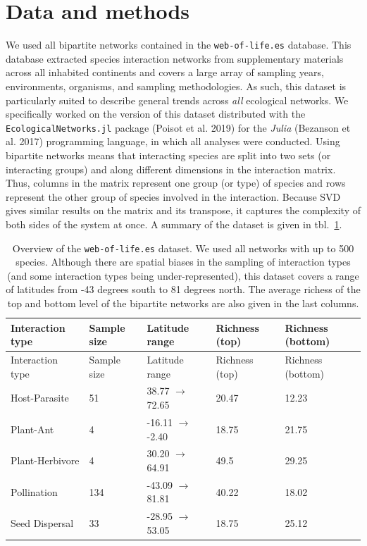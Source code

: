 \documentclass[10pt,oneside]{article}
\begin{document}
\hypertarget{data-and-methods}{%
\section{Data and methods}\label{data-and-methods}}

We used all bipartite networks contained in the \texttt{web-of-life.es}
database. This database extracted species interaction networks from
supplementary materials across all inhabited continents and covers a
large array of sampling years, environments, organisms, and sampling
methodologies. As such, this dataset is particularly suited to describe
general trends across \emph{all} ecological networks. We specifically
worked on the version of this dataset distributed with the
\texttt{EcologicalNetworks.jl} package (Poisot et al. 2019) for the
\emph{Julia} (Bezanson et al. 2017) programming language, in which all
analyses were conducted. Using bipartite networks means that interacting
species are split into two sets (or interacting groups) and along
different dimensions in the interaction matrix. Thus, columns in the
matrix represent one group (or type) of species and rows represent the
other group of species involved in the interaction. Because SVD gives
similar results on the matrix and its transpose, it captures the
complexity of both sides of the system at once. A summary of the dataset
is given in tbl.~\ref{tbl:summary}.

\hypertarget{tbl:summary}{}
\begin{longtable}[]{@{}lllll@{}}
\caption{\label{tbl:summary}Overview of the \texttt{web-of-life.es}
dataset. We used all networks with up to 500 species. Although there are
spatial biases in the sampling of interaction types (and some
interaction types being under-represented), this dataset covers a range
of latitudes from -43 degrees south to 81 degrees north. The average
richess of the top and bottom level of the bipartite networks are also
given in the last columns.}\tabularnewline
\toprule
Interaction type & Sample size & Latitude range & Richness (top) &
Richness (bottom)\tabularnewline
\midrule
\endfirsthead
\toprule
Interaction type & Sample size & Latitude range & Richness (top) &
Richness (bottom)\tabularnewline
\midrule
\endhead
Host-Parasite & 51 & 38.77 \(\rightarrow\) 72.65 & 20.47 &
12.23\tabularnewline
Plant-Ant & 4 & -16.11 \(\rightarrow\) -2.40 & 18.75 &
21.75\tabularnewline
Plant-Herbivore & 4 & 30.20 \(\rightarrow\) 64.91 & 49.5 &
29.25\tabularnewline
Pollination & 134 & -43.09 \(\rightarrow\) 81.81 & 40.22 &
18.02\tabularnewline
Seed Dispersal & 33 & -28.95 \(\rightarrow\) 53.05 & 18.75 &
25.12\tabularnewline
\bottomrule
\end{longtable}
\end{document}
